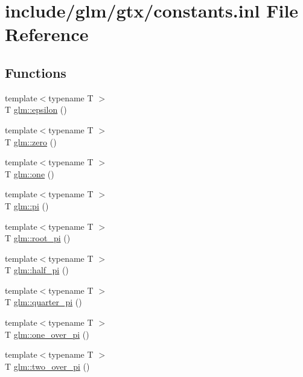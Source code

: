 \hypertarget{constants_8inl}{\section{include/glm/gtx/constants.inl \-File \-Reference}
\label{constants_8inl}
}
\subsection*{\-Functions}
\begin{DoxyCompactItemize}
\item 
{\footnotesize template$<$typename T $>$ }\\\-T \hyperlink{group__gtx__constants_ga0cc442b97435011f216fbb821327793c}{glm\-::epsilon} ()
\item 
{\footnotesize template$<$typename T $>$ }\\\-T \hyperlink{group__gtx__constants_ga67bcfc365971201378f42abb5d7d4672}{glm\-::zero} ()
\item 
{\footnotesize template$<$typename T $>$ }\\\-T \hyperlink{group__gtx__constants_ga9bb2a70c99cb2cc235ccab069a3ca786}{glm\-::one} ()
\item 
{\footnotesize template$<$typename T $>$ }\\\-T \hyperlink{group__gtx__constants_ga69e05a9d6d057c9b85abb28e8918781b}{glm\-::pi} ()
\item 
{\footnotesize template$<$typename T $>$ }\\\-T \hyperlink{group__gtx__constants_ga3fdc81f0f819e97cf045cf1c744d589a}{glm\-::root\-\_\-pi} ()
\item 
{\footnotesize template$<$typename T $>$ }\\\-T \hyperlink{group__gtx__constants_ga07bb93188460e7c43caa63a46f195a56}{glm\-::half\-\_\-pi} ()
\item 
{\footnotesize template$<$typename T $>$ }\\\-T \hyperlink{group__gtx__constants_ga2a1377434bd06788885eac5d61043963}{glm\-::quarter\-\_\-pi} ()
\item 
{\footnotesize template$<$typename T $>$ }\\\-T \hyperlink{group__gtx__constants_ga930ab5f2390cdad192ad92da2968ab37}{glm\-::one\-\_\-over\-\_\-pi} ()
\item 
{\footnotesize template$<$typename T $>$ }\\\-T \hyperlink{group__gtx__constants_ga0414abfb9d780e5d6b96761785f8e842}{glm\-::two\-\_\-over\-\_\-pi} ()

\end{DoxyCompactItemize}
